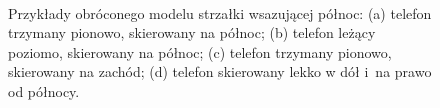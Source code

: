 \begin{figure}[!ht]
 \begin{center}
  \\
 \end{center}
 \caption{
  Przykłady obróconego modelu strzałki wsazującej północ:
  (a) telefon trzymany pionowo, skierowany na północ;
  (b) telefon leżący poziomo, skierowany na północ;
  (c) telefon trzymany pionowo, skierowany na zachód;
  (d) telefon skierowany lekko w dół i~na prawo od północy.
 }
 \label{fig:spaceGraphics_orientation}
\end{figure}
